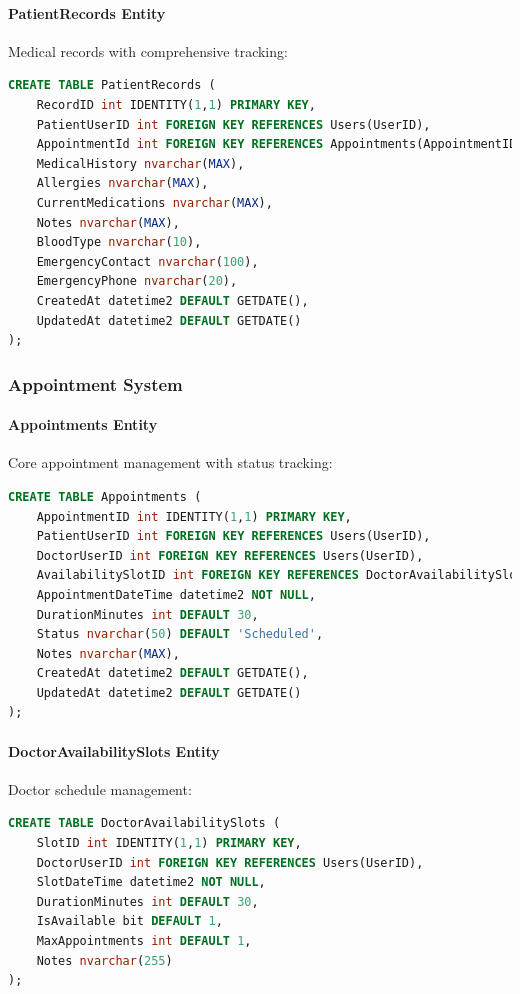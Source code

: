 \documentclass[12pt,a4paper]{article}
\begin{document}
\paragraph{PatientRecords Entity}
Medical records with comprehensive tracking:

\begin{lstlisting}[language=SQL]
CREATE TABLE PatientRecords (
    RecordID int IDENTITY(1,1) PRIMARY KEY,
    PatientUserID int FOREIGN KEY REFERENCES Users(UserID),
    AppointmentId int FOREIGN KEY REFERENCES Appointments(AppointmentID),
    MedicalHistory nvarchar(MAX),
    Allergies nvarchar(MAX),
    CurrentMedications nvarchar(MAX),
    Notes nvarchar(MAX),
    BloodType nvarchar(10),
    EmergencyContact nvarchar(100),
    EmergencyPhone nvarchar(20),
    CreatedAt datetime2 DEFAULT GETDATE(),
    UpdatedAt datetime2 DEFAULT GETDATE()
);
\end{lstlisting}

\subsubsection{Appointment System}

\paragraph{Appointments Entity}
Core appointment management with status tracking:

\begin{lstlisting}[language=SQL]
CREATE TABLE Appointments (
    AppointmentID int IDENTITY(1,1) PRIMARY KEY,
    PatientUserID int FOREIGN KEY REFERENCES Users(UserID),
    DoctorUserID int FOREIGN KEY REFERENCES Users(UserID),
    AvailabilitySlotID int FOREIGN KEY REFERENCES DoctorAvailabilitySlots(SlotID),
    AppointmentDateTime datetime2 NOT NULL,
    DurationMinutes int DEFAULT 30,
    Status nvarchar(50) DEFAULT 'Scheduled',
    Notes nvarchar(MAX),
    CreatedAt datetime2 DEFAULT GETDATE(),
    UpdatedAt datetime2 DEFAULT GETDATE()
);
\end{lstlisting}

\paragraph{DoctorAvailabilitySlots Entity}
Doctor schedule management:

\begin{lstlisting}[language=SQL]
CREATE TABLE DoctorAvailabilitySlots (
    SlotID int IDENTITY(1,1) PRIMARY KEY,
    DoctorUserID int FOREIGN KEY REFERENCES Users(UserID),
    SlotDateTime datetime2 NOT NULL,
    DurationMinutes int DEFAULT 30,
    IsAvailable bit DEFAULT 1,
    MaxAppointments int DEFAULT 1,
    Notes nvarchar(255)
);
\end{lstlisting}
\end{document}
